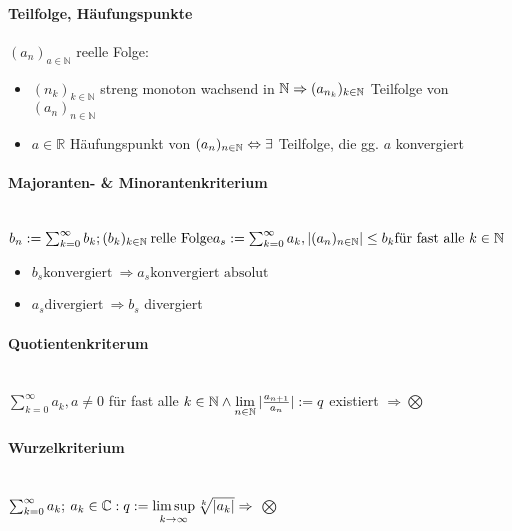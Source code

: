 \documentclass[paper=a3,paper=landscape, fontsize=9pt, DIV=30]{scrartcl}
\newcommand{\real}{{\mathbb{R}}}
\newcommand{\compl}{\mathbb{C}}
\newcommand{\nat}{\mathbb{N}}
\newcommand{\aseq}{(a_n)_{n \in \nat}}
\begin{document}
\begin{multicols*}{4}
  \paragraph{Teilfolge, Häufungspunkte}
  $(a_n)_{a \in \nat}$ reelle Folge:
  \begin{itemize}
  	\item $(n_k)_{k \in \nat}$ streng monoton wachsend in $\nat \\\Rightarrow (a_{n_k})_{k \in \nat}$ Teilfolge von $\aseq$
  	\item $a \in \real$ Häufungspunkt von $\aseq \Leftrightarrow\\\exists$ Teilfolge, die gg. $a$ konvergiert
  \end{itemize}

  \paragraph{Majoranten- \& Minorantenkriterium}\hspace{0pt} \\
  $ b_n := \sum_{k=0}^{\infty} b_k; (b_k)_{k \in \nat}\:\text{relle Folge}\\ a_s := \sum_{k=0}^{\infty} a_k, |\aseq| \leq b_k \text{für fast alle}\ k \in \nat$
  \begin{itemize}
  \item $b_s \text{konvergiert}\ \Rightarrow a_s \text{konvergiert absolut}$
  \item $a_s \text{divergiert}\ \Rightarrow b_s$ divergiert
  \end{itemize}

  \paragraph{Quotientenkriterum}\hspace{0pt} \\
  $ \sum_{k=0}^{\infty} a_k, a \neq 0$ für fast alle $k \in \nat \wedge \lim\limits_{n \in \nat} \arrowvert \frac{a_{n+1}}{a_n} \arrowvert := q$ existiert $\Rightarrow \bigotimes$

  \paragraph{Wurzelkriterium}\hspace{0pt} \\
  $ \sum_{k=0}^{\infty} a_k;\:a_k \in \compl: q := \limsup\limits_{k \rightarrow \infty} \sqrt[k]{\arrowvert a_k \arrowvert} \Rightarrow$ $\bigotimes$


\end{multicols*}
\end{document}
